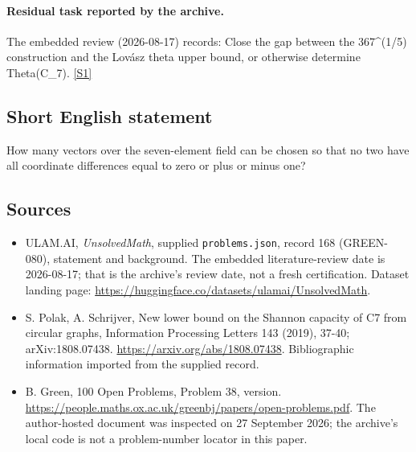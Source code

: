 \documentclass[11pt,a4paper]{article}
\newcommand{\sref}[2]{\hyperlink{source:#1:#2}{[S#2]}}
\begin{document}
\paragraph{Residual task reported by the archive.}

The embedded review (2026-08-17) records: Close the gap between the 367\textasciicircum{}(1/5) construction and the Lovász theta upper bound, or otherwise determine Theta(C\_7). \sref{168}{1}

\subsection{Short English statement}

How many vectors over the seven-element field can be chosen so that no two have all coordinate differences equal to zero or plus or minus one?

\subsection{Sources}

{\small

\begin{itemize}

\item[\hypertarget{source:168:1}{S1}] ULAM.AI, \emph{UnsolvedMath}, supplied \texttt{problems.json}, record 168 (GREEN-080), statement and background. The embedded literature-review date is 2026-08-17; that is the archive’s review date, not a fresh certification. Dataset landing page: \url{https://huggingface.co/datasets/ulamai/UnsolvedMath}.

\item[\hypertarget{source:168:2}{S2}] S. Polak, A. Schrijver, New lower bound on the Shannon capacity of C7 from circular graphs, Information Processing Letters 143 (2019), 37-40; arXiv:1808.07438. \url{https://arxiv.org/abs/1808.07438}. Bibliographic information imported from the supplied record.

\item[\hypertarget{source:168:3}{S3}] B. Green, 100 Open Problems, Problem 38, version. \url{https://people.maths.ox.ac.uk/greenbj/papers/open-problems.pdf}. The author-hosted document was inspected on 27 September 2026; the archive’s local code is not a problem-number locator in this paper.

\end{itemize}

}

\label{end:168}
\end{document}
